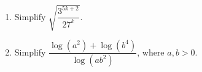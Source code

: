 \documentclass[11pt]{article}
\begin{document}
\begin{enumerate}
            \hrulefill
            
            \hrulefill
            
            \hrulefill
            
            \hrulefill
            
            \hrulefill
            
            \hrulefill
            
            \hrulefill
            
            \hrulefill
            
            \hrulefill
            
            \hrulefill
            
            \hrulefill
            
            \hrulefill
            
            \hrulefill

        \pagebreak
        \item Simplify $\sqrt{\dfrac{3^{5k+2}}{27^k}}$.
        
        \hrulefill
            
            \hrulefill
            
            \hrulefill
            
            \hrulefill
            
            \hrulefill
            
            \hrulefill
            
            \hrulefill
            
            \hrulefill
            
            \hrulefill
            
            \hrulefill
            
            \hrulefill
            
            \hrulefill
            
            \hrulefill

        \item Simplify $\dfrac{\log(a^2)+\log(b^4)}{\log(ab^2)}$, where $a,b>0$.
        
        \hrulefill
            
            \hrulefill
            
            \hrulefill
            
            \hrulefill
            
            \hrulefill
            

\end{enumerate}
\end{document}
